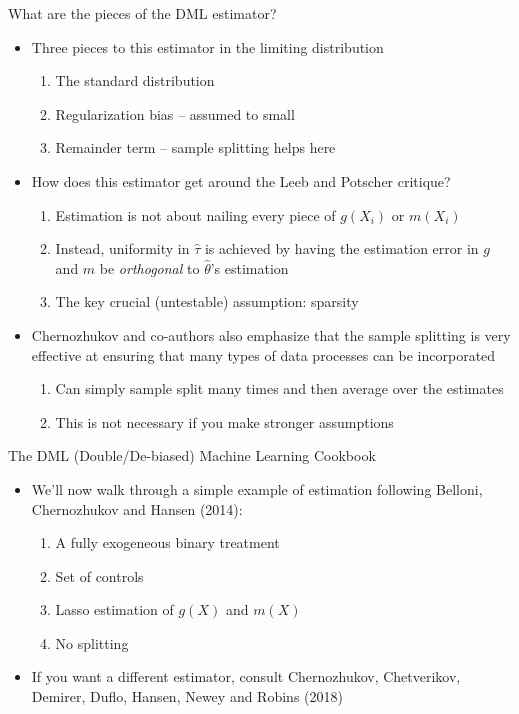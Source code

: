   \begin{frame}{What are the pieces of the DML estimator?}
    \begin{itemize}
    \item Three pieces to this estimator in the limiting distribution
      \begin{enumerate}
      \item The standard distribution
      \item Regularization bias -- assumed to small
      \item Remainder term -- sample splitting helps here
      \end{enumerate}
    \item How does this estimator get around the Leeb and Potscher critique?
      \begin{enumerate}[-]
      \item Estimation is not about nailing every piece of $g(X_{i})$ or $m(X_{i})$
      \item Instead, uniformity in $\hat{\tau}$ is achieved by having
        the estimation error in $g$ and $m$ be \emph{orthogonal} to
        $\hat{\theta}$'s estimation
      \item The key crucial (untestable) assumption: sparsity
      \end{enumerate}
    \item Chernozhukov and co-authors also emphasize that the sample
      splitting is very effective at ensuring that many types of data
      processes can be incorporated
      \begin{enumerate}[-]
      \item Can simply sample split many times and then average over the
        estimates
      \item This is not necessary if you make stronger assumptions
      \end{enumerate}
  \end{itemize}
  \end{frame}
  \begin{frame}{The DML (Double/De-biased) Machine Learning Cookbook}
    \begin{itemize}
    \item We'll now walk through a simple example of estimation
      following Belloni, Chernozhukov and Hansen (2014):
      \begin{enumerate}[-]
      \item A fully exogeneous binary treatment
      \item Set of controls
      \item Lasso estimation of $g(X)$ and $m(X)$
      \item No splitting
      \end{enumerate}
    \item If you want a different estimator, consult
      Chernozhukov, Chetverikov, Demirer, Duflo, Hansen, Newey and
      Robins (2018)
    \end{itemize}
  \end{frame}
  
